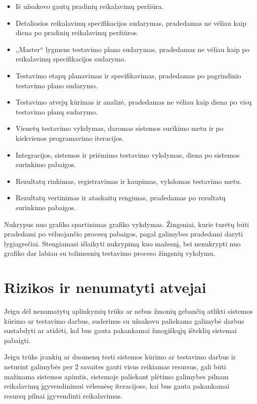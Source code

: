 \documentclass{VUMIFPSkursinis}
\begin{document}
    \begin{itemize}
    	\item Iš užsakovo gautų pradinių reikalavimų peržiūra.
    	\item Detaliosios reikalavimų specifikacijos sudarymas, pradedamas ne vėliau kaip diena po pradinių reikalavimų peržiūros.
    	\item „Master“ lygmens testavimo plano sudarymas, pradedamas ne vėliau kaip po reikalavimų specifikacijos sudarymo.
    	\item Testavimo etapų planavimas ir specifikavimas, pradedamas po pagrindinio testavimo plano sudarymo.
    	\item Testavimo atvejų kūrimas ir analizė, pradedamas ne vėliau kaip diena po visų testavimo planų sudarymo.
    	\item Vienetų testavimo vykdymas, daromas sistemos surikimo metu ir po kiekvienos programavimo iteracijos.
    	\item Integracijos, sistemos ir priėmimo testavimo vykdymas, diena po sistemos surinkimo pabaigos.
    	\item Rezultatų rinkimas, registravimas ir kaupimas, vykdomas testavimo metu.
    	\item Rezultatų vertinimas ir ataskaitų rengimas, pradedamas po rezultatų surinkimo pabaigos.
    \end{itemize}

    Nukrypus nuo grafiko spartinimas grafiko vykdymas. Žingsniai, kurie turėtų būti pradedami po vėluojančio procesų pabaigos, pagal galimybes pradedami daryti lygiagrečiai. 
    Stengiamasi išlaikyti nukrypimą kuo mažesnį, bei nenukrypti nuo grafiko dar labiau su tolimesnių testavimo proceso žingsnių vykdymu. 
    
    \section{Rizikos ir nenumatyti atvejai}

    Jeigu dėl nenumatytų aplinkymių trūks ar nebus žmonių gebančių atlikti sistemos kūrimo ar testavimo darbus, 
     suderinus su užsakovu paliekama galimybė darbus sustabdyti ar atidėti, kol bus gauta pakankamai žmogiškųjų išteklių sistemai pabaigti. 

    Jeigu trūks įrankių ar duomenų testi sistemos kūrimo ar testavimo darbus ir neturint galimybės per 2 savaites gauti visus reikiamas resursus,
     gali būti mažinama sistemos apimtis, sistemoje paliekant plėtimo galimybes pilnam reikalavimų įgyvendinimui vėlesnėsę iteracijose, 
     kai bus gauta pakankamai resursų pilnai įgyvendinti reikalavimus.
\end{document}
